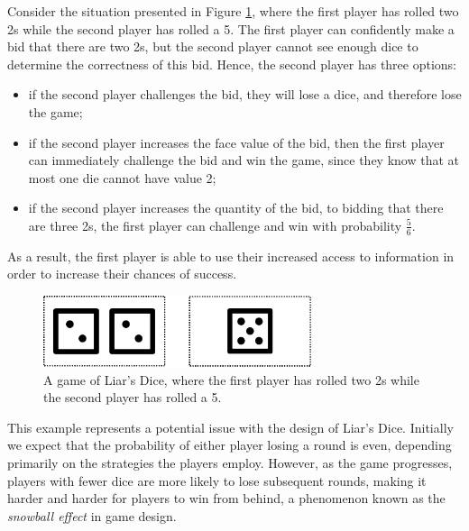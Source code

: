 \begin{example}
\label{cs2:hidden_info_example}

Consider the situation presented in Figure \ref{cs2:uneven_information}, where the first player has rolled two 2s while the second player has rolled a 5. The first player can confidently make a bid that there are two 2s, but the second player cannot see enough dice to determine the correctness of this bid. Hence, the second player has three options:

\begin{itemize}

\item if the second player challenges the bid, they will lose a dice, and therefore lose the game;
\item if the second player increases the face value of the bid, then the first player can immediately challenge the bid and win the game, since they know that at most one die cannot have value 2;
\item if the second player increases the quantity of the bid, to bidding that there are three 2s, the first player can challenge and win with probability $\frac{5}{6}$.

\end{itemize}

As a result, the first player is able to use their increased access to information in order to increase their chances of success.

\end{example}

\begin{figure}[h]
    \centering
    \includegraphics[width=0.7\textwidth]{images/LiarsDice/different_information.pdf}
    \caption{A game of Liar's Dice, where the first player has rolled two 2s while the second player has rolled a 5.}
    \label{cs2:uneven_information}
\end{figure}

This example represents a potential issue with the design of Liar's Dice. Initially we expect that the probability of either player losing a round is even, depending primarily on the strategies the players employ. However, as the game progresses, players with fewer dice are more likely to lose subsequent rounds, making it harder and harder for players to win from behind, a phenomenon known as the \emph{snowball effect} in game design. 

